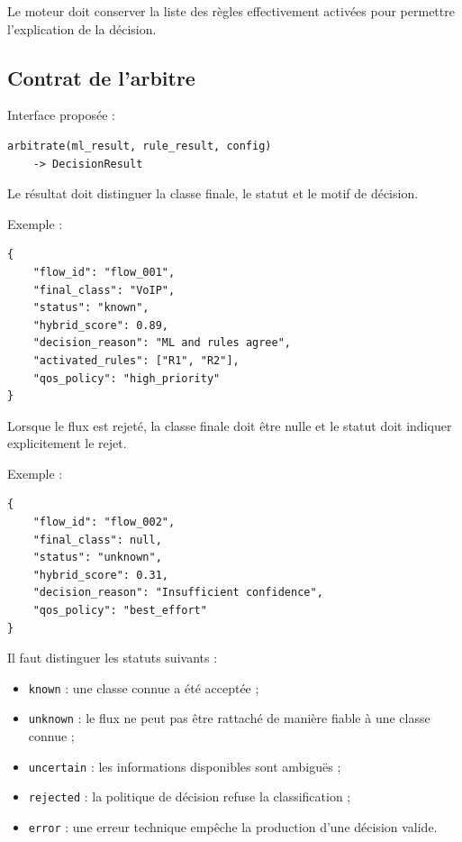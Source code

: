 Le moteur doit conserver la liste des règles effectivement activées pour permettre l'explication de la décision.

\subsection{Contrat de l'arbitre}

Interface proposée :

\begin{verbatim}
arbitrate(ml_result, rule_result, config)
    -> DecisionResult
\end{verbatim}

Le résultat doit distinguer la classe finale, le statut et le motif de décision.

Exemple :

\begin{verbatim}
{
    "flow_id": "flow_001",
    "final_class": "VoIP",
    "status": "known",
    "hybrid_score": 0.89,
    "decision_reason": "ML and rules agree",
    "activated_rules": ["R1", "R2"],
    "qos_policy": "high_priority"
}
\end{verbatim}

Lorsque le flux est rejeté, la classe finale doit être nulle et le statut doit indiquer explicitement le rejet.

Exemple :

\begin{verbatim}
{
    "flow_id": "flow_002",
    "final_class": null,
    "status": "unknown",
    "hybrid_score": 0.31,
    "decision_reason": "Insufficient confidence",
    "qos_policy": "best_effort"
}
\end{verbatim}

Il faut distinguer les statuts suivants :

\begin{itemize}
    \item \texttt{known} : une classe connue a été acceptée ;
    \item \texttt{unknown} : le flux ne peut pas être rattaché de manière fiable à une classe connue ;
    \item \texttt{uncertain} : les informations disponibles sont ambiguës ;
    \item \texttt{rejected} : la politique de décision refuse la classification ;
    \item \texttt{error} : une erreur technique empêche la production d'une décision valide.
\end{itemize}

